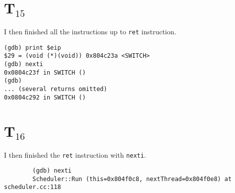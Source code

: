 \documentclass[letterpaper, 10pt]{article}
\begin{document}
	\section*{T$_{15}$}

	I then finished all the instructions up to {\tt ret} instruction.

	\begin{verbatim}
(gdb) print $eip
$29 = (void (*)(void)) 0x804c23a <SWITCH>
(gdb) nexti
0x0804c23f in SWITCH ()
(gdb)
... (several returns omitted)
0x0804c292 in SWITCH ()
	\end{verbatim}

	\section*{T$_{16}$}

	I then finished the {\tt ret} instruction with {\tt nexti}.

	\begin{verbatim}
		(gdb) nexti
		Scheduler::Run (this=0x804f0c8, nextThread=0x804f0e8) at scheduler.cc:118
	\end{verbatim}
\end{document}
